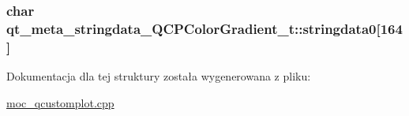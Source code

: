 \subsubsection[{\texorpdfstring{stringdata0}{stringdata0}}]{\setlength{\rightskip}{0pt plus 5cm}char qt\+\_\+meta\+\_\+stringdata\+\_\+\+Q\+C\+P\+Color\+Gradient\+\_\+t\+::stringdata0\mbox{[}164\mbox{]}}\hypertarget{structqt__meta__stringdata___q_c_p_color_gradient__t_af6991165899703d0e9df570ab79718c3}{}\label{structqt__meta__stringdata___q_c_p_color_gradient__t_af6991165899703d0e9df570ab79718c3}


Dokumentacja dla tej struktury została wygenerowana z pliku\+:\begin{DoxyCompactItemize}
\item 
\hyperlink{moc__qcustomplot_8cpp}{moc\+\_\+qcustomplot.\+cpp}\end{DoxyCompactItemize}
